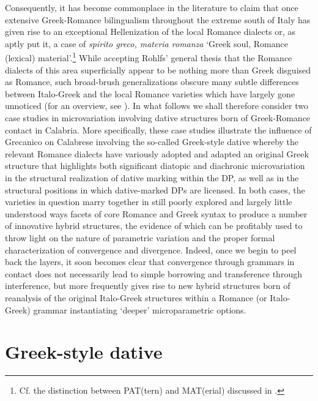 \documentclass[output=paper,modfonts,nonflat,colorlinks,citecolor=brown]{langsci/langscibook}
\begin{document}
Consequently, it has become commonplace in the literature to claim that once extensive Greek-Romance bilingualism throughout the extreme south of Italy has given rise to an exceptional Hellenization of the local Romance dialects or, as \citet[61]{Rohlfs1933} aptly put it, a case of \textit{spirito greco, materia romanza} `Greek soul, Romance (lexical) material'.\footnote{Cf. the distinction between PAT(tern) and MAT(erial) discussed in \citet{MatrasSakel2004,MatrasSakel2007}.} While accepting Rohlfs’ general thesis that the Romance dialects of this area superficially appear to be nothing more than Greek disguised as Romance, such broad-brush generalizations obscure many subtle differences between Italo-Greek and the local Romance varieties which have largely gone unnoticed (for an overview, see \citealt{Ledgeway2013}). In what follows we shall therefore consider two case studies in microvariation involving dative structures born of Greek-Romance contact in Calabria. More specifically, these case studies illustrate the influence of Grecanico on Calabrese involving the so-called Greek-style dative whereby the relevant Romance dialects have variously adopted and adapted an original Greek structure that highlights both significant diatopic and diachronic microvariation in the structural realization of dative marking within the DP, as well as in the structural positions in which dative-marked DPs are licensed. In both cases, the varieties in question marry together in still poorly explored and largely little understood ways facets of core Romance and Greek syntax to produce a number of innovative hybrid structures, the evidence of which can be profitably used to throw light on the nature of parametric variation and the proper formal characterization of convergence and divergence. Indeed, once we begin to peel back the layers, it soon becomes clear that convergence through grammars in contact does not necessarily lead to simple borrowing and transference through interference, but more frequently gives rise to new hybrid structures born of reanalysis of the original Italo-Greek structures within a Romance (or Italo-Greek) grammar instantiating `deeper' microparametric options.

\section{Greek-style dative}
\end{document}
